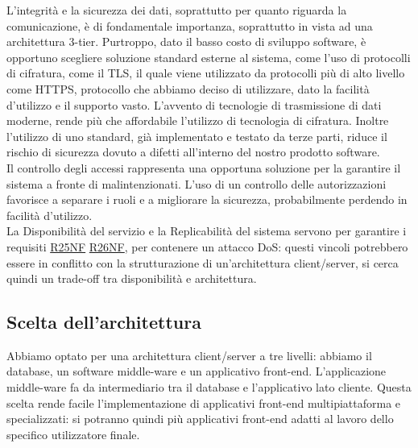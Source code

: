 \documentclass[a4paper]{article}
\begin{document}
L'integrità e la sicurezza dei dati, soprattutto per quanto riguarda la comunicazione, è di fondamentale importanza, soprattutto in vista ad una architettura 3-tier. Purtroppo, dato il basso costo di sviluppo software, è opportuno scegliere soluzione standard esterne al sistema, come l'uso di protocolli di cifratura, come il TLS, il quale viene utilizzato da protocolli più di alto livello come HTTPS, protocollo che abbiamo deciso di utilizzare, dato la facilità d'utilizzo e il supporto vasto. L'avvento di tecnologie di trasmissione di dati moderne, rende più che affordabile l'utilizzo di tecnologia di cifratura. Inoltre l'utilizzo di uno standard, già implementato e testato da terze parti, riduce il rischio di sicurezza dovuto a difetti all'interno del nostro prodotto software.\\Il controllo degli accessi rappresenta una opportuna soluzione per la garantire il sistema a fronte di malintenzionati. L'uso di un controllo delle autorizzazioni favorisce a separare i ruoli e a migliorare la sicurezza, probabilmente perdendo in facilità d'utilizzo.\\La Disponibilità del servizio e la Replicabilità del sistema servono per garantire i requisiti \hyperlink{R25NF}{R25NF} \hyperlink{R26NF}{R26NF}, per contenere un attacco DoS: questi vincoli potrebbero essere in conflitto con la strutturazione di un'architettura client/server, si cerca quindi un trade-off tra disponibilità e architettura.


\subsection{Scelta dell'architettura}
Abbiamo optato per una architettura client/server a tre livelli: abbiamo il database, un software middle-ware e un applicativo front-end. L'applicazione middle-ware fa da intermediario tra il database e l'applicativo lato cliente. Questa scelta rende facile l'implementazione di applicativi front-end multipiattaforma e specializzati: si potranno quindi più applicativi front-end adatti al lavoro dello specifico utilizzatore finale.
\end{document}
